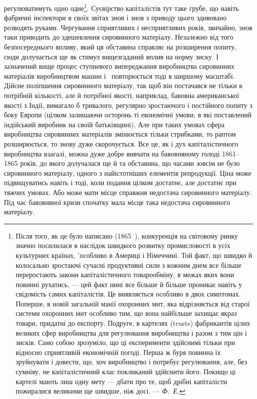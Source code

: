 регулюватимуть одно одне\footnote{
Після того, як це було написано (1865~), конкуренція на світовому ринку
значно посилилася в наслідок швидкого розвитку промисловості в усіх культурних
країнах, 'особливо в Америці і Німеччині. Той факт, що швидко й колосально
зростаючі сучасні продуктивні сили з кожним днем все більше переростають
закони капіталістичного товарообміну, в межах яких вони повинні
рухатись, — цей факт нині все більше й більше проникає навіть у свідомість
самих капіталістів. Це виявляється особливо в двох симптомах. Поперше, в новій
загальній манії охоронних мит, яка відрізняється від старої системи охоронних
мит особливо тим, що вона найбільше захищає якраз товари, придатні до
експорту. Подруге, в картелях (trusts) фабрикантів цілих великих сфер виробництва
для регулювання виробництва і разом з тим цін і зисків. Само собою
зрозуміло, що ці експерименти здійснимі тільки при відносно сприятливій
економічній погоді. Перша ж буря повинна їх зруйнувати і довести, що, хоч
виробництво і потребує регулювання, але, без сумніву, не капіталістичний клас
покликаний здійснити його. Покищо ці картелі мають лиш одну мету —
дбати про те, щоб дрібні капіталісти пожиралися великими ще швидше, ніж
досі. — \emph{Ф.~Е.}
}. Суєвірство капіталістів тут таке
грубе, що навіть фабричні інспектори в своїх звітах знов і знов
з приводу цього здивовано розводять руками. Чергування сприятливих
і несприятливих років, звичайно, знов таки приводить до
здешевлення сировинного матеріалу. Незалежно від того безпосереднього
впливу, який ця обставина справляє на розширення
попиту, сюди долучається ще як стимул вищезгаданий
вплив на норму зиску. І зазначений вище процес ступневого
випереджання виробництва сировинних матеріалів виробництвом
машин і~ повторюється тоді в ширшому масштабі. Дійсне
поліпшення сировинного матеріалу, так щоб він постачався не
тільки в потрібній кількості, але й потрібної якості, наприклад,
бавовна американської якості з Індії, вимагало б тривалого, регулярно
зростаючого і постійного попиту з боку Европи (цілком
залишаючи осторонь ті економічні умови, в які поставлений індійський
виробник на своїй батьківщині). Але при таких умовах
сфера виробництва сировинних матеріалів змінюється тільки
стрибками, то раптом розширюється, то знову дуже скорочується.
Все це, як і дух капіталістичного виробництва взагалі, можна
дуже добре вивчати на бавовняному голоді 1861--1865 років, до
якого долучалася ще й та обставина, що часами зовсім не було
сировинного матеріалу, одного з найістотніших елементів репродукції.
Ціна може підвищуватись навіть і тоді, коли подання
цілком достатнє, але достатнє при тяжчих умовах. Або може
мати місце справжня недостача сировинного матеріалу. Під час
бавовняної кризи спочатку мала місце така недостача сировинного
матеріалу.

